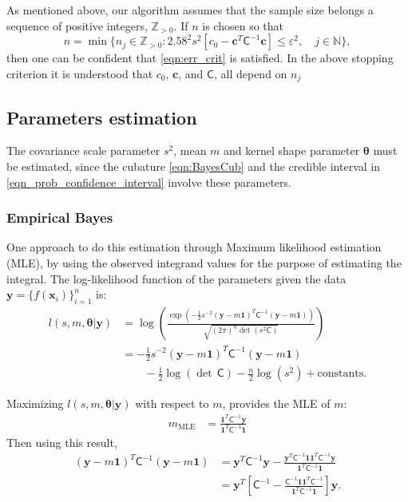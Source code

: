 \documentclass[twocolumn]{svjour3}          %
\newcommand{\bm}[1]{\boldsymbol{#1}}
\newcommand{\naturals}{\mathbb{N}}
\newcommand{\posIntegers}{\mathbb{Z}_{> 0}}
\newcommand{\vtheta}{{\bm{\theta}}}
\newcommand{\vc}{\bm{c}}
\newcommand{\vx}{\bm{x}}
\newcommand{\vy}{\bm{y}}
\newcommand{\vone}{\bm{1}}
\newcommand{\mC}{\mathsf{C}}
\newcommand{\mCInv}{{\mathsf{C}^{-1}}}
\newcommand{\MLE}{\text{MLE}}
\newcommand{\errtol}{\varepsilon}
\newenvironment{nalign}{
    \begin{equation}
    \begin{aligned}
}{
    \end{aligned}
    \end{equation}
    \ignorespacesafterend
}
\begin{document}
As mentioned above, our algorithm assumes that the sample size belongs a sequence of positive integers, $\posIntegers$.  If $n$ is chosen so that 
\begin{equation} \label{FJH:eq:stopcritA}
n = \min\{n_j \in \posIntegers: 2.58^2s ^2 [c_0  -\vc ^T \mC^{-1} \vc] \le \errtol^2, \quad j \in \naturals \} ,
\end{equation}
then one can be confident that \eqref{eqn:err_crit} is satisfied.  In the above stopping criterion it is understood that $c_0$, $\vc$, and $\mC$, all depend on $n_j$











\subsection{Parameters estimation}
The covariance scale parameter $s^2$, mean $m$ and kernel shape parameter $\vtheta$ must be estimated, since the cubature \eqref{eqn:BayesCub} and the credible interval in \eqref{eqn_prob_confidence_interval} involve these parameters.

\subsubsection{Empirical Bayes}
One approach to do this estimation through Maximum likelihood estimation (MLE), by using the observed integrand values for the purpose of estimating the integral.  The log-likelihood function of the parameters given the data $\vy = \{f(\vx_i)\}_{i=1}^n$ is:
\begin{nalign}
l(s,m,\vtheta | \vy) &= \log 
\left(
\frac{
\exp\left( -\frac{1}{2} s^{-2} (\vy-m\vone)^T\mCInv(\vy-m\vone)\right) }
{\sqrt{(2\pi)^n \det(s^2\mC)}}
\right) 
\\
&= -\frac{1}{2} s^{-2} (\vy-m\vone)^T\mCInv(\vy-m\vone) 
\\
& \qquad - \frac{1}{2} \log(\det\, \mC) - \frac{n}{2} \log(s^2) + \text{constants.}
\end{nalign}

Maximizing $l(s,m,\vtheta | \vy)$ with respect to $m$, provides the MLE of $m$:
\begin{align}
\label{eqn_m_MLE}
m_\MLE &= \frac{\vone^T \mCInv \vy }{ \vone^T \mCInv \vone}
\end{align}
Then using this result, 
\begin{align*}
(\vy-m\vone)^T\mCInv(\vy-m\vone) 
& = 
\vy^T\mCInv\vy - \frac{\vy^T \mCInv \vone \vone^T \mCInv \vy}{\vone^T\mCInv \vone}
\\
& = \vy^T 
\left[ 
\mCInv - 
\frac{ \mCInv \vone \vone^T \mCInv }{\vone^T\mCInv \vone}
\right] \vy.
\end{align*}
\end{document}

